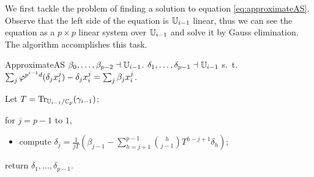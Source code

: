 We first tackle the problem of finding a solution to equation
\eqref{eq:approximateAS}. Observe that the left side of the equation
is $\mathbb{U}_{i-1}$ linear, thus we can see the equation as a $p\times p$
linear system over $\mathbb{U}_{i-1}$ and solve it by Gauss elimination. The
algorithm  accomplishes this task.

\begin{algorithm}
  {ApproximateAS}
  {$\beta_0,\ldots,\beta_{p-2}\dashv\mathbb{U}_{i-1}$.}
  {$\delta_1,\ldots,\delta_{p-1}\dashv\mathbb{U}_{i-1}$ s.~t. 
    $\sum_j\varphi^{p^{i-1}d}(\delta_jx_i^j) - \delta_jx_i^j =
    \sum_j\beta_jx_i^j$.}
\item \label{alg:approx:trace}Let $T =
  \operatorname{Tr}_{\mathbb{U}_{i-1}/\mathbb{C}_p}(\gamma_{i-1})$;
\item \label{alg:approx:for}for $j = p-1$ to $1$,
  \begin{itemize}
  \item compute $\delta_j = \frac{1}{jT}
    \left(\beta_{j-1} - \sum_{h=j+1}^{p-1}\binom{h}{j-1}T^{h-j+1}\delta_h\right)$;
  \end{itemize}
\item return $\delta_1,\ldots,\delta_{p-1}$.
\end{algorithm}


